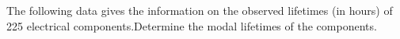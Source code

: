 \begin{flushleft}
The following data gives the information on the observed lifetimes (in hours) of 225
electrical components.Determine the modal lifetimes of the components.
\end{flushleft}

\begin{table}[ht!]
\centering

\end{table} 
